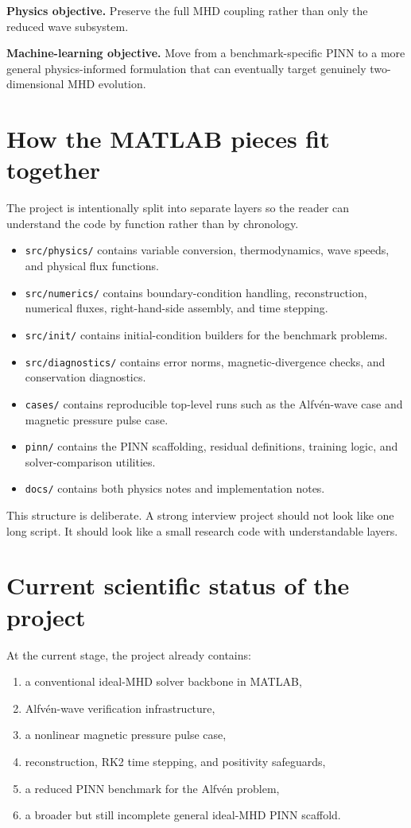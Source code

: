 \documentclass[11pt]{article}
\begin{document}
\textbf{Physics objective.} Preserve the full MHD coupling rather than only the reduced wave subsystem.

\textbf{Machine-learning objective.} Move from a benchmark-specific PINN to a more general physics-informed formulation that can eventually target genuinely two-dimensional MHD evolution.

\section{How the MATLAB pieces fit together}

The project is intentionally split into separate layers so the reader can understand the code by function rather than by chronology.

\begin{itemize}[leftmargin=1.8em]
    \item \texttt{src/physics/} contains variable conversion, thermodynamics, wave speeds, and physical flux functions.
    \item \texttt{src/numerics/} contains boundary-condition handling, reconstruction, numerical fluxes, right-hand-side assembly, and time stepping.
    \item \texttt{src/init/} contains initial-condition builders for the benchmark problems.
    \item \texttt{src/diagnostics/} contains error norms, magnetic-divergence checks, and conservation diagnostics.
    \item \texttt{cases/} contains reproducible top-level runs such as the Alfv\'en-wave case and magnetic pressure pulse case.
    \item \texttt{pinn/} contains the PINN scaffolding, residual definitions, training logic, and solver-comparison utilities.
    \item \texttt{docs/} contains both physics notes and implementation notes.
\end{itemize}

This structure is deliberate. A strong interview project should not look like one long script. It should look like a small research code with understandable layers.

\section{Current scientific status of the project}

At the current stage, the project already contains:
\begin{enumerate}[leftmargin=1.8em]
    \item a conventional ideal-MHD solver backbone in MATLAB,
    \item Alfv\'en-wave verification infrastructure,
    \item a nonlinear magnetic pressure pulse case,
    \item reconstruction, RK2 time stepping, and positivity safeguards,
    \item a reduced PINN benchmark for the Alfv\'en problem,
    \item a broader but still incomplete general ideal-MHD PINN scaffold.
\end{enumerate}
\end{document}
